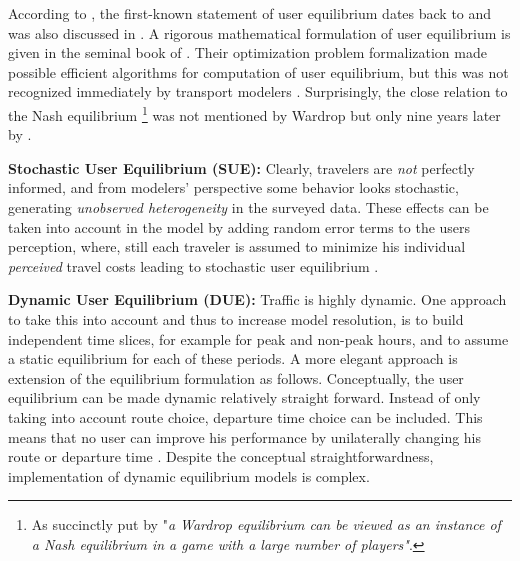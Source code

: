 According to \citet[][p.162]{BoyceEtAl_JRS_1988}, the first-known statement of user equilibrium dates back to \citet[][]{Pigou_1920} and was also discussed in \citet[][]{Knight_QJE_1924}. A rigorous mathematical formulation of user equilibrium is given in the seminal book of \citet[][]{BeckmannEtAl_1956}. Their optimization problem formalization made possible efficient algorithms for computation of user equilibrium, but this was not recognized immediately by transport modelers \citep[][p.26]{BoyceWilliams_ERSA_2003}. Surprisingly, the close relation to the Nash equilibrium \citep[][]{Nash_AM_1951, Nash_PNAS_1950} \footnote{
As succinctly put by \citet[][]{CorreaStier_Cochran_2010} "\emph{a Wardrop equilibrium can be viewed as an instance of a Nash equilibrium in a game with a large number of players"}.} was not mentioned by Wardrop but only nine years later by \citet[][]{CharnesCooper_Herman_1961}.

\textbf{Stochastic User Equilibrium (SUE):}
Clearly, travelers are \emph{not} perfectly informed, and from modelers' perspective some behavior looks stochastic, generating \emph{unobserved heterogeneity} in the surveyed data. These effects can be taken into account in the model by adding random error terms to the users perception, where, still each traveler is assumed to minimize his individual \emph{perceived} travel costs \citep[][p. 363]{OrtuzarWillumsen_2001} leading to stochastic user equilibrium \citep[][]{DaganzoSheffi_TransScience_1977}.  

\textbf{Dynamic User Equilibrium (DUE):}
Traffic is highly dynamic. One approach to take this into account and thus to increase model resolution, is to build independent time slices, for example for peak and non-peak hours, and to assume a static equilibrium for each of these periods. A more elegant approach is extension of the equilibrium formulation as follows. Conceptually, the user equilibrium can be made dynamic relatively straight forward. Instead of only taking into account route choice, departure time choice can be included. This means that no user can improve his performance by unilaterally changing his route or departure time \citep[see e.g.,][p.411]{Friesz_Hillier_2010}. Despite the conceptual straightforwardness, implementation of dynamic equilibrium models is complex.

